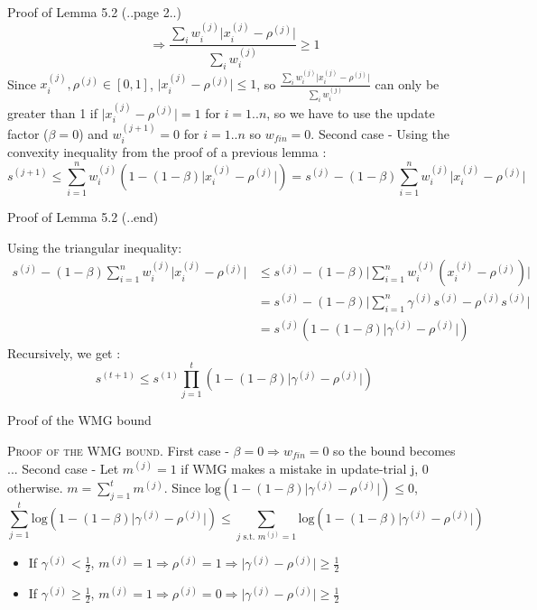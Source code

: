 \documentclass{beamer}
\begin{document}
\begin{frame}{Proof of Lemma 5.2 (..page 2..)}
\[\Rightarrow\frac{\sum_i w_i^{(j)}\lvert x_i^{(j)} - \rho^{(j)}\rvert}{\sum_i w_i^{(j)}} \geq 1\]
Since $x_i^{(j)}, \rho^{(j)}\in [0,1]$, $\lvert x_i^{(j)} - \rho^{(j)} \rvert \leq 1$, so $\frac{\sum_i w_i^{(j)}\lvert x_i^{(j)} - \rho^{(j)}\rvert}{\sum_i w_i^{(j)}}$ can only be greater than 1 if $\lvert x_i^{(j)} - \rho^{(j)} \rvert = 1$ for $i=1..n$, so we have to use the update factor ($\beta = 0$) and $w_i^{(j+1)} = 0$ for $i = 1..n$ so $w_{fin} = 0$. \newline \newline
Second case - Using the convexity inequality from the proof of a previous lemma :
\[s^{(j+1)}\leq\sum_{i=1}^{n} w_i^{(j)}(1-(1-\beta)\lvert x_i^{(j)}-\rho^{(j)}\rvert) = s^{(j)} - (1 - \beta)\sum_{i=1}^{n} w_i^{(j)}\lvert x_i^{(j)}-\rho^{(j)}\rvert\]

\end{frame}

\begin{frame}{Proof of Lemma 5.2 (..end)}

Using the triangular inequality:
\begin{align*}
s^{(j)} - (1 - \beta)\sum_{i=1}^{n} w_i^{(j)}\lvert x_i^{(j)}-\rho^{(j)}\rvert &\leq s^{(j)} - (1 - \beta)\lvert\sum_{i=1}^{n} w_i^{(j)}(x_i^{(j)}-\rho^{(j)})\rvert\\
																																						&= s^{(j)} - (1 - \beta)\lvert\sum_{i=1}^{n} \gamma^{(j)}s^{(j)}-\rho^{(j)}s^{(j)}\rvert\\
																																						&= s^{(j)}(1 - (1 - \beta)\lvert\gamma^{(j)} -\rho^{(j)}\rvert)
\end{align*}
Recursively, we get :
\[s^{(t+1)} \leq s^{(1)}\prod_{j=1}^{t}(1 - (1 - \beta)\lvert\gamma^{(j)} -\rho^{(j)}\rvert)\]
\end{frame}

\begin{frame}{Proof of the WMG bound}

\textsc{Proof of the WMG bound}.
First case - $\beta = 0 \Rightarrow w_{fin} = 0$ so the bound becomes ...
Second case - Let $m^{(j)} = 1$ if WMG makes a mistake in update-trial j, 0 otherwise. $m=\sum_{j=1}^{t} m^{(j)}$.\newline
Since $\mathrm{log}(1-(1-\beta)\lvert\gamma^{(j)} - \rho^{(j)}\rvert)\leq 0$,
\[\sum_{j=1}^{t}\mathrm{log}(1-(1-\beta)\lvert\gamma^{(j)} - \rho^{(j)}\rvert)\leq \sum_{j\text{ s.t. }m^{(j)}=1}\mathrm{log}(1-(1-\beta)\lvert\gamma^{(j)} - \rho^{(j)}\rvert)\]
\begin{itemize}
\item If $\gamma^{(j)}<\frac{1}{2}$, $m^{(j)}=1\Rightarrow\rho^{(j)}=1\Rightarrow\lvert\gamma^{(j)} - \rho^{(j)}\rvert\geq\frac{1}{2}$
\item If $\gamma^{(j)}\geq\frac{1}{2}$, $m^{(j)}=1\Rightarrow\rho^{(j)}=0\Rightarrow\lvert\gamma^{(j)} - \rho^{(j)}\rvert\geq\frac{1}{2}$
\end{itemize}

\end{frame}
\end{document}
